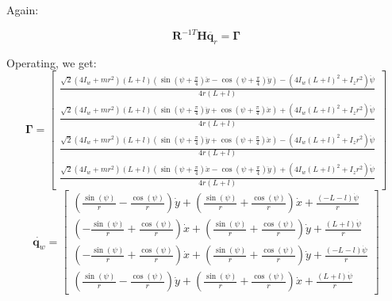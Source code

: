 \documentclass[12pt]{article}
\renewcommand{\vec}[1]{\bm{#1}}
\newcommand{\R}{\mathbb R}
\def\Torque{\vec \Gamma}
\def\R{\vec R}
\def\q{\vec q}
\begin{document}
Again:

$$ \R^{-1T} \vec H \ddot{\q_r} =\Torque$$

Operating, we get: 
$$\Torque = \left[\begin{matrix}\frac{\sqrt{2} \left(4 I_{w} + m r^{2}\right) \left(L + l\right) \left(\operatorname{sin}\left(\psi + \frac{\pi}{4}\right) \ddot{x} - \operatorname{cos}\left(\psi + \frac{\pi}{4}\right) \ddot{y}\right) - \left(4 I_{w} \left(L + l\right)^{2} + I_{z} r^{2}\right) \ddot{\psi}}{4 r \left(L + l\right)}\\\frac{\sqrt{2} \left(4 I_{w} + m r^{2}\right) \left(L + l\right) \left(\operatorname{sin}\left(\psi + \frac{\pi}{4}\right) \ddot{y} + \operatorname{cos}\left(\psi + \frac{\pi}{4}\right) \ddot{x}\right) + \left(4 I_{w} \left(L + l\right)^{2} + I_{z} r^{2}\right) \ddot{\psi}}{4 r \left(L + l\right)}\\\frac{\sqrt{2} \left(4 I_{w} + m r^{2}\right) \left(L + l\right) \left(\operatorname{sin}\left(\psi + \frac{\pi}{4}\right) \ddot{y} + \operatorname{cos}\left(\psi + \frac{\pi}{4}\right) \ddot{x}\right) - \left(4 I_{w} \left(L + l\right)^{2} + I_{z} r^{2}\right) \ddot{\psi}}{4 r \left(L + l\right)}\\\frac{\sqrt{2} \left(4 I_{w} + m r^{2}\right) \left(L + l\right) \left(\operatorname{sin}\left(\psi + \frac{\pi}{4}\right) \ddot{x} - \operatorname{cos}\left(\psi + \frac{\pi}{4}\right) \ddot{y}\right) + \left(4 I_{w} \left(L + l\right)^{2} + I_{z} r^{2}\right) \ddot{\psi}}{4 r \left(L + l\right)}\end{matrix}\right] $$
$$\dot{\q_w} =   \left[\begin{matrix}\left(\frac{\operatorname{sin}\left(\psi\right)}{r} - \frac{\operatorname{cos}\left(\psi\right)}{r}\right) \dot{y} + \left(\frac{\operatorname{sin}\left(\psi\right)}{r} + \frac{\operatorname{cos}\left(\psi\right)}{r}\right) \dot{x} + \frac{\left(- L - l\right) \dot{\psi}}{r}\\\left(- \frac{\operatorname{sin}\left(\psi\right)}{r} + \frac{\operatorname{cos}\left(\psi\right)}{r}\right) \dot{x} + \left(\frac{\operatorname{sin}\left(\psi\right)}{r} + \frac{\operatorname{cos}\left(\psi\right)}{r}\right) \dot{y} + \frac{\left(L + l\right) \dot{\psi}}{r}\\\left(- \frac{\operatorname{sin}\left(\psi\right)}{r} + \frac{\operatorname{cos}\left(\psi\right)}{r}\right) \dot{x} + \left(\frac{\operatorname{sin}\left(\psi\right)}{r} + \frac{\operatorname{cos}\left(\psi\right)}{r}\right) \dot{y} + \frac{\left(- L - l\right) \dot{\psi}}{r}\\\left(\frac{\operatorname{sin}\left(\psi\right)}{r} - \frac{\operatorname{cos}\left(\psi\right)}{r}\right) \dot{y} + \left(\frac{\operatorname{sin}\left(\psi\right)}{r} + \frac{\operatorname{cos}\left(\psi\right)}{r}\right) \dot{x} + \frac{\left(L + l\right) \dot{\psi}}{r}\end{matrix}\right]$$
\end{document}
